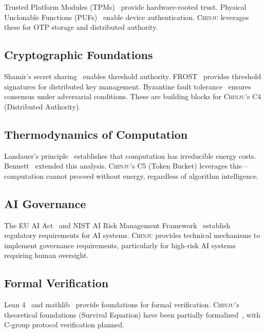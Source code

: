 \documentclass[11pt,a4paper]{article}
\newcommand{\chinju}{\textsc{Chinju}}
\begin{document}
Trusted Platform Modules (TPMs)~\cite{tcg2007tpm,parno2010bootstrapping,sailer2004design} provide hardware-rooted trust.
Physical Unclonable Functions (PUFs)~\cite{suh2007physical} enable device authentication.
\chinju{} leverages these for OTP storage and distributed authority.

\subsection{Cryptographic Foundations}

Shamir's secret sharing~\cite{shamir1979share} enables threshold authority.
FROST~\cite{komlo2020frost} provides threshold signatures for distributed key management.
Byzantine fault tolerance~\cite{castro1999practical,lamport1982byzantine} ensures consensus under adversarial conditions.
These are building blocks for \chinju{}'s C4 (Distributed Authority).

\subsection{Thermodynamics of Computation}

Landauer's principle~\cite{landauer1961irreversibility} establishes that computation has irreducible energy costs.
Bennett~\cite{bennett1982thermodynamics} extended this analysis.
\chinju{}'s C5 (Token Bucket) leverages this---computation cannot proceed without energy, regardless of algorithm intelligence.

\subsection{AI Governance}

The EU AI Act~\cite{euaiact2024} and NIST AI Risk Management Framework~\cite{nist2023ai} establish regulatory requirements for AI systems.
\chinju{} provides technical mechanisms to implement governance requirements, particularly for high-risk AI systems requiring human oversight.

\subsection{Formal Verification}

Lean 4~\cite{moura2021lean} and mathlib~\cite{mathlib2020} provide foundations for formal verification.
\chinju{}'s theoretical foundations (Survival Equation) have been partially formalized~\cite{ugentropy_lean}, with C-group protocol verification planned.
\end{document}
